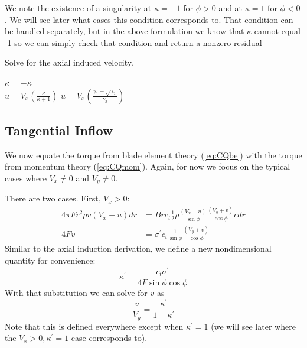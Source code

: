 \documentclass{article}
\begin{document}
We note the existence of a singularity at $\kappa = -1$ for $\phi > 0$ and at $\kappa = 1$ for $\phi < 0$.  We will see later what cases this condition corresponds to.  That condition can be handled separately, but in the above formulation we know that $\kappa$ cannot equal -1 so we can simply check that condition and return a nonzero residual

\begin{algorithm}[htbp]
\caption{Solve for the axial induced velocity.}
\begin{algorithmic}

    \State $\kappa = -\kappa$
\EndIf
\\
    \State $u = V_x \left(\frac{\kappa}{\kappa + 1}\right)$
\Else
    \State $u = V_x \left(\frac{\gamma_1 - \sqrt{\gamma_2}}{\gamma_3}\right)$
\EndIf
\end{algorithmic}
\label{alg:u}
\end{algorithm}

\subsection{Tangential Inflow}

We now equate the torque from blade element theory (\cref{eq:CQbe}) with the torque from momentum theory (\cref{eq:CQmom}).  Again, for now we focus on the typical cases where $V_x \ne 0$ and $V_y \ne 0$.

There are two cases.  First, $V_x > 0$:
\begin{equation}
\begin{aligned}    
4 \pi F r^2 \rho v (V_x - u) dr &= B r c_t \frac{1}{2}\rho \frac{(V_x  - u)}{\sin \phi} \frac{(V_y + v)}{\cos \phi} c dr\\
4 F v &= \sigma^\prime c_t \frac{1}{\sin \phi} \frac{(V_y + v)}{\cos \phi}
\end{aligned}
\end{equation}
Similar to the axial induction derivation, we define a new nondimensional quantity for convenience:
\begin{equation}
    \kappa^\prime = \frac{c_t \sigma^\prime}{4 F \sin\phi \cos\phi}
\end{equation}
With that substitution we can solve for $v$ as
\begin{equation}
    \frac{v}{V_y} = \frac{\kappa^\prime}{1 - \kappa^\prime}
    \label{eq:aprime}
\end{equation}
Note that this is defined everywhere except when $\kappa^\prime = 1$ (we will see later where the $V_x > 0, \kappa^\prime = 1$ case corresponds to).
\end{document}
